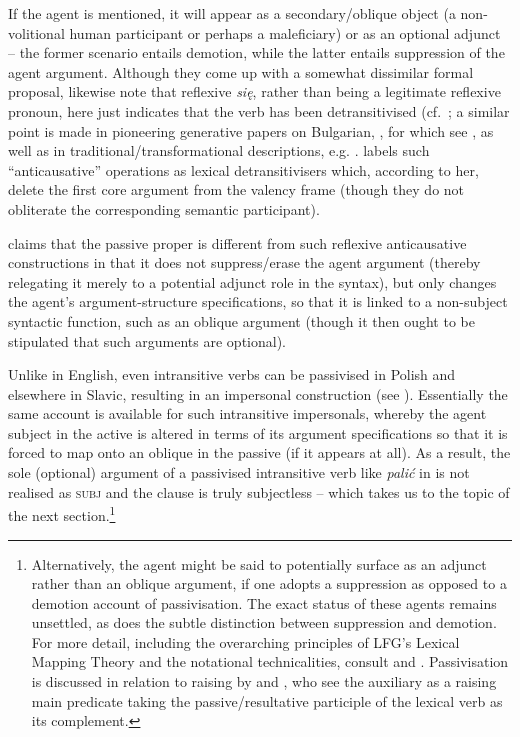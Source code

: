 \documentclass[output=paper,hidelinks]{langscibook}
\begin{document}
\largerpage[2]
If the agent is mentioned, it will appear as a secondary/oblique object (a non-volitional human participant or perhaps a maleficiary) or as an optional adjunct -- the former scenario entails demotion, while the latter entails suppression of the agent argument. Although they come up with a somewhat dissimilar formal proposal, \citet{PatejukPrzepiorkowski2015} likewise note that reflexive \textit{się}, rather than being a legitimate reflexive pronoun, here just indicates that the verb has been detransitivised (cf.\ \citealt{Schenker1985}; a similar point is made in pioneering generative papers on Bulgarian, \citealt{Walter1963a,Walter1963}, for which see \citealt{Venkova2017}, as well as in traditional/transformational descriptions, e.g. \citet[604]{BojadievKucarovPencev1999}. \citet{Kibort2012} labels such ``anticausative'' operations as lexical detransitivisers which, according to her, delete the first core argument from the valency frame (though they do not obliterate the corresponding semantic participant).    

\citet{Kibort2007,Kibort2012} claims that the passive proper is different from such reflexive anticausative constructions in that it does not suppress/erase the agent argument (thereby relegating it merely to a potential adjunct role in the syntax), but only changes the agent's argument-structure specifications, so that it is linked to a non-subject syntactic function, such as an oblique argument (though it then ought to be stipulated that such arguments are optional). 


Unlike in English, even intransitive verbs can be passivised in Polish and elsewhere in Slavic, resulting in an impersonal construction (see \citealt{Kibort2001,Kibort2012}). Essentially the same account is available for such intransitive impersonals, where\-by the agent subject in the active is altered in terms of its argument specifications so that it is forced to map onto an oblique in the passive (if it appears at all). As a result, the sole (optional) argument of a passivised intransitive verb like \textit{pali\'{c}} in  is not realised as \textsc{subj} and the clause is truly subjectless -- which takes us to the topic of the next section.\footnote{Alternatively, the agent might be said to potentially surface as an adjunct rather than an oblique argument, if one adopts a suppression as opposed to a demotion account of passivisation. The exact status of these agents remains unsettled, as does the subtle distinction between suppression and demotion. For more detail, including the overarching principles of LFG's Lexical Mapping Theory and the notational technicalities, consult \citet{Kibort2001,Kibort2007} and .  Passivisation is discussed in relation to raising by \citet{Kibort2012} and \citet{PatejukPrzepiorkowski2014b}, who see the auxiliary as a raising main predicate taking the passive/resultative participle of the lexical verb as its complement.}
\end{document}
